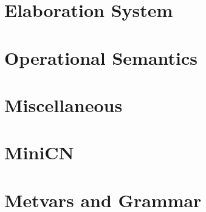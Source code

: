 \section{Elaboration System}
\cndefnsinfXXres%
\cndefnselabXXaction%
\cndefnselabXXmemop%
\cndefnselabXXspine%
\cndefnselabXXexpr%
\cndefnselab%

\section{Operational Semantics}
\cndefnssubsXXjudge%
\cndefnspureXXopsem%
\cndefnsopsem%

\section{Miscellaneous}
\cndefnsproofXXdefns%
\cndefnsuserXXdefns%
\cndefnsheapXXsat%

\section{MiniCN}
\cndefnsmini%

\section{Metvars and Grammar}
\cnmetavars\\[\baselineskip]
\cngrammar%

\endgroup%